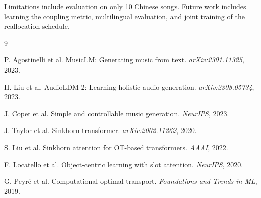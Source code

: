 \documentclass[11pt,a4paper]{article}
\begin{document}
Limitations include evaluation on only 10 Chinese songs. Future work includes learning the coupling metric, multilingual evaluation, and joint training of the reallocation schedule.

\begin{thebibliography}{9}

P. Agostinelli et al. MusicLM: Generating music from text. \textit{arXiv:2301.11325}, 2023.

H. Liu et al. AudioLDM 2: Learning holistic audio generation. \textit{arXiv:2308.05734}, 2023.

J. Copet et al. Simple and controllable music generation. \textit{NeurIPS}, 2023.

J. Taylor et al. Sinkhorn transformer. \textit{arXiv:2002.11262}, 2020.

S. Liu et al. Sinkhorn attention for OT-based transformers. \textit{AAAI}, 2022.

F. Locatello et al. Object-centric learning with slot attention. \textit{NeurIPS}, 2020.

G. Peyr\'{e} et al. Computational optimal transport. \textit{Foundations and Trends in ML}, 2019.

\end{thebibliography}
\end{document}
